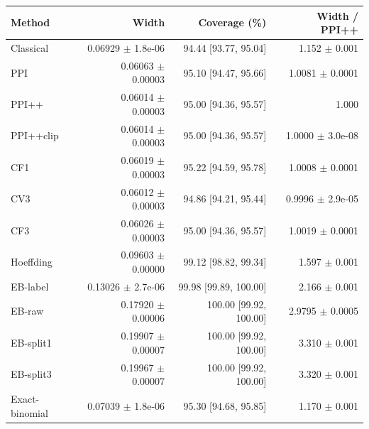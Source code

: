 \small
\begin{tabular}{lrrr}
\toprule
Method & Width & Coverage (\%) & Width / PPI++ \\
\midrule
Classical & 0.06929 $\pm$ 1.8e-06 & 94.44 [93.77, 95.04] & 1.152 $\pm$ 0.001 \\
PPI & 0.06063 $\pm$ 0.00003 & 95.10 [94.47, 95.66] & 1.0081 $\pm$ 0.0001 \\
PPI++ & 0.06014 $\pm$ 0.00003 & 95.00 [94.36, 95.57] & 1.000 \\
PPI++clip & 0.06014 $\pm$ 0.00003 & 95.00 [94.36, 95.57] & 1.0000 $\pm$ 3.0e-08 \\
CF1 & 0.06019 $\pm$ 0.00003 & 95.22 [94.59, 95.78] & 1.0008 $\pm$ 0.0001 \\
CV3 & 0.06012 $\pm$ 0.00003 & 94.86 [94.21, 95.44] & 0.9996 $\pm$ 2.9e-05 \\
CF3 & 0.06026 $\pm$ 0.00003 & 95.00 [94.36, 95.57] & 1.0019 $\pm$ 0.0001 \\
Hoeffding & 0.09603 $\pm$ 0.00000 & 99.12 [98.82, 99.34] & 1.597 $\pm$ 0.001 \\
EB-label & 0.13026 $\pm$ 2.7e-06 & 99.98 [99.89, 100.00] & 2.166 $\pm$ 0.001 \\
EB-raw & 0.17920 $\pm$ 0.00006 & 100.00 [99.92, 100.00] & 2.9795 $\pm$ 0.0005 \\
EB-split1 & 0.19907 $\pm$ 0.00007 & 100.00 [99.92, 100.00] & 3.310 $\pm$ 0.001 \\
EB-split3 & 0.19967 $\pm$ 0.00007 & 100.00 [99.92, 100.00] & 3.320 $\pm$ 0.001 \\
Exact-binomial & 0.07039 $\pm$ 1.8e-06 & 95.30 [94.68, 95.85] & 1.170 $\pm$ 0.001 \\
\bottomrule
\end{tabular}
